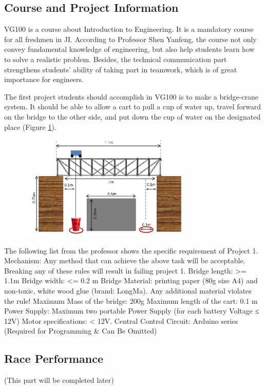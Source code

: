 \subsection{Course and Project Information}


VG100 is a course about Introduction to Engineering. It is a mandatory course
for all freshmen in JI. According to Professor Shen Yanfeng, the course not only
convey fundamental knowledge of engineering, but also help students learn how to
solve a realistic problem. Besides, the technical communication part strengthens
students’ ability of taking part in teamwork, which is of great importance for
engineers.  

The first project students should accomplish in VG100 is to make a bridge-crane
system. It should be able to allow a cart to pull a cup of water up, travel
forward on the bridge to the other side, and put down the cup of water on the
designated place (Figure \ref{fig:structureOfP1}).  

\begin{figure}[htbp]
\centering
\includegraphics[height=5cm]{figure/structureOfP1}
\caption{\label{fig:structureOfP1}}
\end{figure}

The following list from the professor shows the specific requirement of Project 1.
Mechanism: Any method that can achieve the above task will be acceptable.
Breaking any of these rules will result in failing project 1.  
Bridge length:  >= 1.1m 
Bridge width:  <= 0.2 m 
Bridge Material: printing paper (80g size A4) and non-toxic, white wood glue
(brand: LongMa). Any additional material violates the rule!  
Maximum Mass of the bridge: 200g 
Maximum length of the cart: 0.1 m 
Power Supply: Maximum two portable Power Supply (for each battery Voltage ≤ 12V) 
Motor specifications: < 12V.  
Central Control Circuit: Arduino series (Required for Programming \& Can Be Omitted)

\subsection{Race Performance}
(This part will be completed later)


